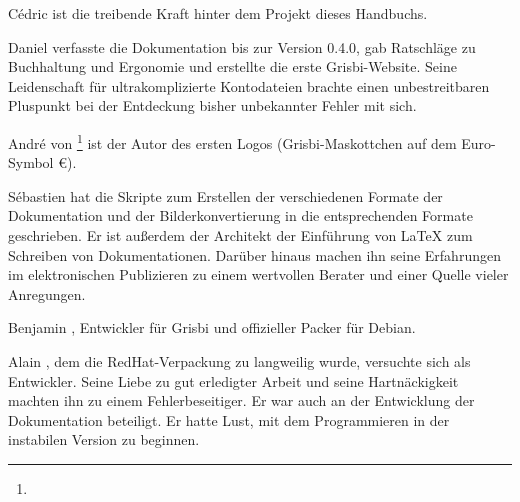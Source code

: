 {%
Cédric  ist die treibende Kraft hinter dem Projekt dieses Handbuchs.

Daniel  verfasste die Dokumentation bis zur Version 0.4.0, gab Ratschläge zu Buchhaltung und Ergonomie und erstellte die erste Grisbi-Website. Seine Leidenschaft für ultrakomplizierte Kontodateien brachte einen unbestreitbaren Pluspunkt bei der Entdeckung bisher unbekannter Fehler mit sich.

André  von \footnote{\urlLinuxGraphic{}} ist der Autor des ersten Logos (Grisbi-Maskottchen auf dem Euro-Symbol €).

Sébastien  hat die Skripte zum Erstellen der verschiedenen Formate der Dokumentation und der Bilderkonvertierung in die entsprechenden Formate geschrieben. Er ist außerdem der Architekt der Einführung von \gls{LaTeX} zum Schreiben von Dokumentationen. Darüber hinaus machen ihn seine Erfahrungen im elektronischen Publizieren zu einem wertvollen Berater und einer Quelle vieler Anregungen.

Benjamin , Entwickler für Grisbi und offizieller Packer für \gls{Debian}.

Alain , dem die \gls{RedHat}-Verpackung zu langweilig wurde, versuchte sich als Entwickler. Seine Liebe zu gut erledigter Arbeit und seine Hartnäckigkeit machten ihn zu einem Fehlerbeseitiger. Er war auch an der Entwicklung der Dokumentation beteiligt. Er hatte Lust, mit dem Programmieren in der instabilen Version zu beginnen.

}
